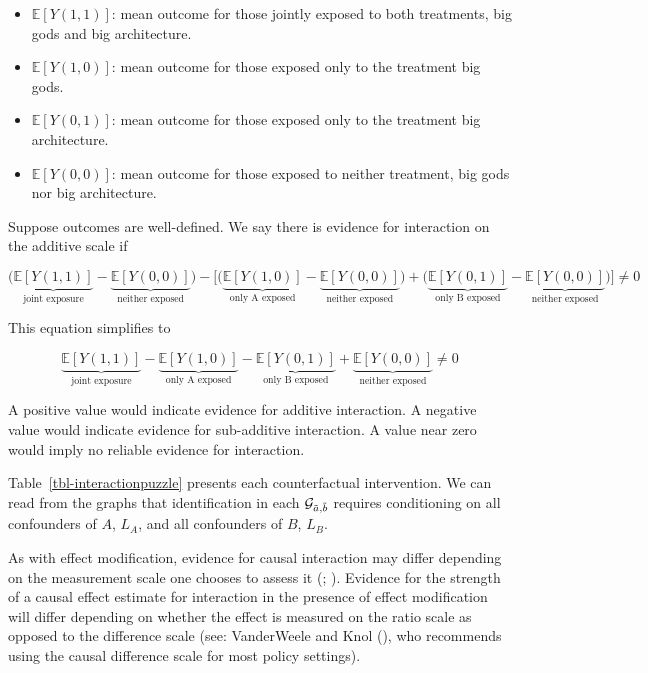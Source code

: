 \documentclass[
  single column]{article}
\providecommand{\tightlist}{%
  \setlength{\itemsep}{0pt}\setlength{\parskip}{0pt}}\usepackage{longtable,booktabs,array}
\begin{document}
\begin{itemize}
\tightlist
\item
  \(\mathbb{E}[Y(1,1)]\): mean outcome for those jointly exposed to both
  treatments, big gods and big architecture.
\item
  \(\mathbb{E}[Y(1,0)]\): mean outcome for those exposed only to the
  treatment big gods.
\item
  \(\mathbb{E}[Y(0,1)]\): mean outcome for those exposed only to the
  treatment big architecture.
\item
  \(\mathbb{E}[Y(0,0)]\): mean outcome for those exposed to neither
  treatment, big gods nor big architecture.
\end{itemize}

Suppose outcomes are well-defined. We say there is evidence for
interaction on the additive scale if

\[
\bigg(\underbrace{\mathbb{E}[Y(1,1)]}_{\text{joint exposure}} - \underbrace{\mathbb{E}[Y(0,0)]}_{\text{neither exposed}}\bigg) - \bigg[ \bigg(\underbrace{\mathbb{E}[Y(1,0)]}_{\text{only A exposed}} - \underbrace{\mathbb{E}[Y(0,0)]}_{\text{neither exposed}}\bigg) + \bigg(\underbrace{\mathbb{E}[Y(0,1)]}_{\text{only B exposed}} - \underbrace{\mathbb{E}[Y(0,0)]}_{\text{neither exposed}} \bigg)\bigg] \neq 0 
\]

This equation simplifies to

\[ 
\underbrace{\mathbb{E}[Y(1,1)]}_{\text{joint exposure}} - \underbrace{\mathbb{E}[Y(1,0)]}_{\text{only A exposed}} - \underbrace{\mathbb{E}[Y(0,1)]}_{\text{only B exposed}} + \underbrace{\mathbb{E}[Y(0,0)]}_{\text{neither exposed}} \neq 0 
\]

A positive value would indicate evidence for additive interaction. A
negative value would indicate evidence for sub-additive interaction. A
value near zero would imply no reliable evidence for interaction.

Table~\ref{tbl-interactionpuzzle} presents each counterfactual
intervention. We can read from the graphs that identification in each
\(\mathcal{G}_{\Tilde{a}, \Tilde{b}}\) requires conditioning on all
confounders of \(A\), \(L_A\), and all confounders of \(B\), \(L_B\).

As with effect modification, evidence for causal interaction may differ
depending on the measurement scale one chooses to assess it
(;
). Evidence for
the strength of a causal effect estimate for interaction in the presence
of effect modification will differ depending on whether the effect is
measured on the ratio scale as opposed to the difference scale (see:
VanderWeele and Knol (), who
recommends using the causal difference scale for most policy settings).
\end{document}
